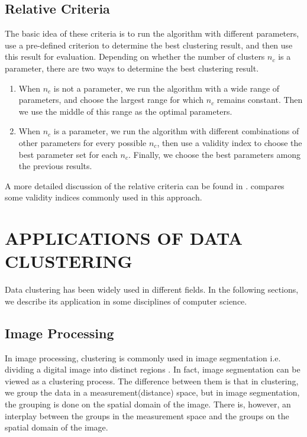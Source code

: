 \documentclass[conference]{IEEEtran}
\begin{document}
\subsection{Relative Criteria}
The basic idea of these criteria is to run the algorithm with different parameters, use a pre-defined criterion to determine the best clustering result, and then use this result for evaluation. Depending on whether the number of clusters $n_c$ is a parameter, there are two ways to determine the best clustering result.

\begin{enumerate}
\item When $n_c$ is not a parameter, we run the algorithm with a wide range of parameters, and choose the largest range for which $n_c$ remains constant. Then we use the middle of this range as the optimal parameters.
\item When $n_c$ is a parameter, we run the algorithm  with different combinations of other parameters for every possible $n_c$, then use a validity index to choose the best parameter set for each $n_c$. Finally, we choose the best parameters among the previous results.
\end{enumerate}

A more detailed discussion of the relative criteria can be found in \cite{Halkidi:2002:CVC:601858.601862}. \cite{bezdek1998some} compares some validity indices commonly used in this approach.

\section{APPLICATIONS OF DATA CLUSTERING} \label{sec:application}
Data clustering has been widely used in different fields. In the following sections, we describe its application in some disciplines of computer science.

\subsection{Image Processing}
In image processing, clustering is commonly used in image segmentation i.e. dividing a digital image into distinct regions \cite{haralick1985image}. In fact, image segmentation can be viewed as a clustering process. The difference between them is that in clustering, we group the data in a measurement(distance) space, but in image segmentation, the grouping is done
on the spatial domain of the image. There is, however, an interplay between the groups in the measurement space and the groups on the spatial domain of the image.
\end{document}
